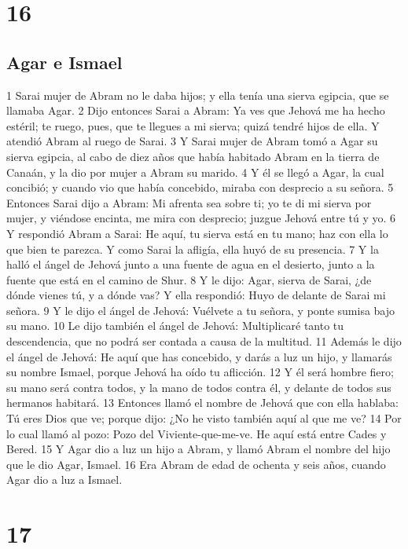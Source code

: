 \chapter{16}

\section{Agar e Ismael}

1 Sarai mujer de Abram no le daba hijos; y ella tenía una sierva egipcia, que se llamaba Agar.
2 Dijo entonces Sarai a Abram: Ya ves que Jehová me ha hecho estéril; te ruego, pues, que te llegues a mi sierva; quizá tendré hijos de ella. Y atendió Abram al ruego de Sarai.
3 Y Sarai mujer de Abram tomó a Agar su sierva egipcia, al cabo de diez años que había habitado Abram en la tierra de Canaán, y la dio por mujer a Abram su marido.
4 Y él se llegó a Agar, la cual concibió; y cuando vio que había concebido, miraba con desprecio a su señora.
5 Entonces Sarai dijo a Abram: Mi afrenta sea sobre ti; yo te di mi sierva por mujer, y viéndose encinta, me mira con desprecio; juzgue Jehová entre tú y yo.
6 Y respondió Abram a Sarai: He aquí, tu sierva está en tu mano; haz con ella lo que bien te parezca. Y como Sarai la afligía, ella huyó de su presencia.
7 Y la halló el ángel de Jehová junto a una fuente de agua en el desierto, junto a la fuente que está en el camino de Shur.
8 Y le dijo: Agar, sierva de Sarai, ¿de dónde vienes tú, y a dónde vas? Y ella respondió: Huyo de delante de Sarai mi señora.
9 Y le dijo el ángel de Jehová: Vuélvete a tu señora, y ponte sumisa bajo su mano.
10 Le dijo también el ángel de Jehová: Multiplicaré tanto tu descendencia, que no podrá ser contada a causa de la multitud.
11 Además le dijo el ángel de Jehová: He aquí que has concebido, y darás a luz un hijo, y llamarás su nombre Ismael, porque Jehová ha oído tu aflicción.
12 Y él será hombre fiero; su mano será contra todos, y la mano de todos contra él, y delante de todos sus hermanos habitará.
13 Entonces llamó el nombre de Jehová que con ella hablaba: Tú eres Dios que ve; porque dijo: ¿No he visto también aquí al que me ve?
14 Por lo cual llamó al pozo: Pozo del Viviente-que-me-ve. He aquí está entre Cades y Bered.
15 Y Agar dio a luz un hijo a Abram, y llamó Abram el nombre del hijo que le dio Agar, Ismael.
16 Era Abram de edad de ochenta y seis años, cuando Agar dio a luz a Ismael.

\chapter{17}

